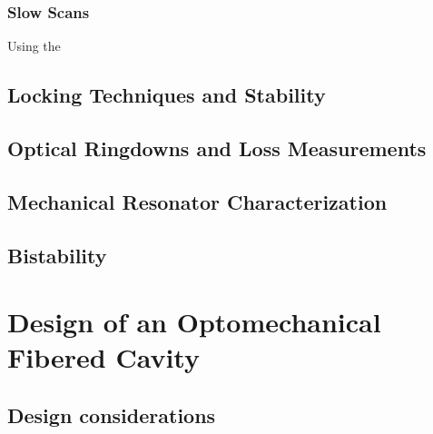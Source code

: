 \subsubsection{Slow Scans}
Using the 
\subsection{Locking Techniques and Stability}
\subsection{Optical Ringdowns and Loss Measurements}
\subsection{Mechanical Resonator Characterization}
\subsection{Bistability}

\section{Design of an Optomechanical Fibered Cavity}
\subsection{Design considerations}

\vspace{-\baselineskip}

